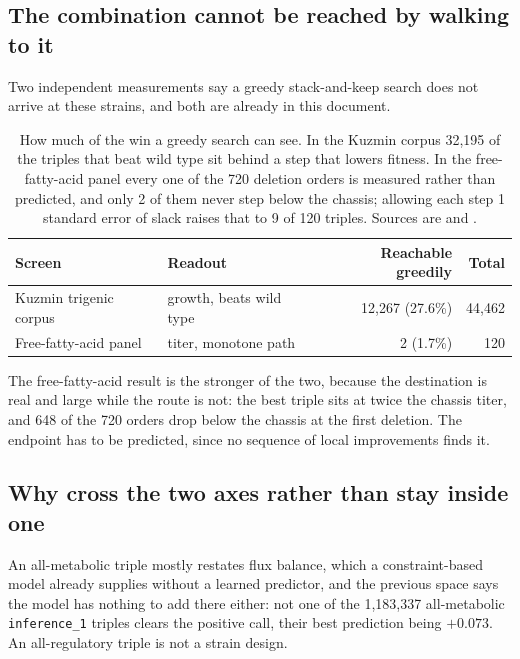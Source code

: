 \subsection{The combination cannot be reached by walking to it}

Two independent measurements say a greedy stack-and-keep search does not arrive
at these strains, and both are already in this document.

\begin{table}[H]
\centering
\footnotesize
\begin{tabular}{llrr}
\toprule
Screen & Readout & Reachable greedily & Total \\
\midrule
Kuzmin trigenic corpus & growth, beats wild type & 12{,}267 (27.6\%) & 44{,}462 \\
Free-fatty-acid panel  & titer, monotone path    & 2 (1.7\%)         & 120 \\
\bottomrule
\end{tabular}
\caption{How much of the win a greedy search can see. In the Kuzmin corpus
32{,}195 of the triples that beat wild type sit behind a step that lowers
fitness. In the free-fatty-acid panel every one of the 720 deletion orders is
measured rather than predicted, and only 2 of them never step below the chassis;
allowing each step 1 standard error of slack raises that to 9 of 120 triples.
Sources are \protect{}
and \protect{}.}
\end{table}

The free-fatty-acid result is the stronger of the two, because the destination is
real and large while the route is not: the best triple sits at twice the chassis
titer, and 648 of the 720 orders drop below the chassis at the first deletion.
The endpoint has to be predicted, since no sequence of local improvements finds
it.

\subsection{Why cross the two axes rather than stay inside one}

An all-metabolic triple mostly restates flux balance, which a constraint-based
model already supplies without a learned predictor, and the previous space says
the model has nothing to add there either: not one of the 1{,}183{,}337
all-metabolic \texttt{inference\_1} triples clears the positive call, their best
prediction being $+0.073$. An all-regulatory triple is not a strain design.

